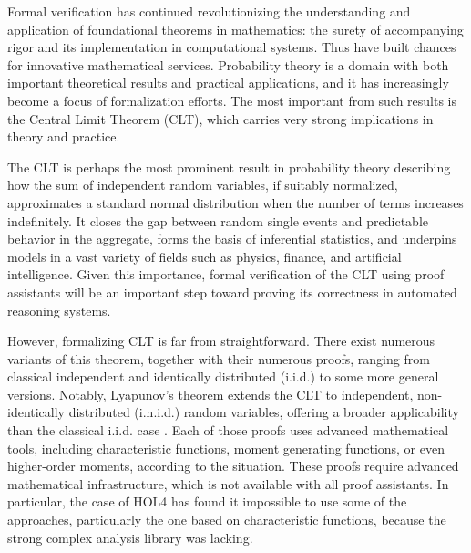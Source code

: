 
Formal verification has continued revolutionizing the understanding and application of foundational theorems in mathematics: the surety of accompanying rigor and its implementation in computational systems. Thus have built chances for innovative mathematical services. Probability theory is a domain with both important theoretical results and practical applications, and it has increasingly become a focus of formalization efforts. The most important from such results is the Central Limit Theorem (CLT), which carries very strong implications in theory and practice.

The CLT is perhaps the most prominent result in probability theory describing how the sum of independent random variables, if suitably normalized, approximates a standard normal distribution when the number of terms increases indefinitely. It closes the gap between random single events and predictable behavior in the aggregate, forms the basis of inferential statistics, and underpins models in a vast variety of fields such as physics, finance, and artificial intelligence. Given this importance, formal verification of the CLT using proof assistants will be an important step toward proving its correctness in automated reasoning systems.

However, formalizing CLT is far from straightforward. There exist numerous variants of this theorem, together with their numerous proofs, ranging from classical independent and identically distributed (i.i.d.) to some more general versions. Notably, Lyapunov's theorem extends the CLT to independent, non-identically distributed (i.n.i.d.) random variables, offering a broader applicability than the classical i.i.d. case \cite{billingsley2017probability}. Each of those proofs uses advanced mathematical tools, including characteristic functions, moment generating functions, or even higher-order moments, according to the situation. These proofs require advanced mathematical infrastructure, which is not available with all proof assistants. In particular, the case of HOL4 \cite{slind2008brief} has found it impossible to use some of the approaches, particularly the one based on characteristic functions, because the strong complex analysis library was lacking.

